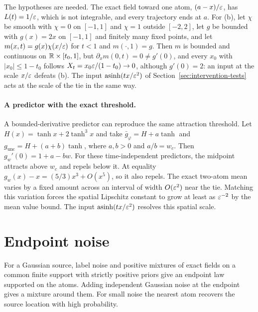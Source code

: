 \documentclass{article} %
\theoremstyle{plain}
\theoremstyle{definition}
\theoremstyle{remark}
\begin{document}
The hypotheses are needed. The exact field toward one atom, $(a-x)/\varepsilon$, has
$L(t)=1/\varepsilon$, which is not integrable, and every trajectory ends at $a$. For (b), let
$\chi$ be smooth with $\chi=0$ on $[-1,1]$ and $\chi=1$ outside $[-2,2]$, let $g$ be bounded with
$g(x)=2x$ on $[-1,1]$ and finitely many fixed points, and let $m(x,t)=g(x)\chi(x/\varepsilon)$ for
$t<1$ and $m(\cdot,1)=g$. Then $m$ is bounded and continuous on $\mathbb{R}\times[t_0,1]$, but
$\partial_xm(0,t)=0\ne g'(0)$, and every $x_0$ with $|x_0|\le1-t_0$ follows
$X_t=x_0\varepsilon/(1-t_0)\to0$, although $g'(0)=2$: an input at the scale $x/\varepsilon$ defeats
(b). The input $\operatorname{asinh}(tx/\varepsilon^2)$ of Section~\ref{sec:intervention-tests} acts at
the scale of the tie in the same way.

\paragraph{A predictor with the exact threshold.} A bounded-derivative predictor can reproduce the same attraction threshold. Let
$H(x)=\tanh x+2\tanh^3x$ and take $\bar g_\varphi=H+a\tanh$ and
$g_{\mathrm{unc}}=H+(a+b)\tanh$, where $a,b>0$ and $a/b=w_c$.
Then $g_w'(0)=1+a-bw$. For these time-independent predictors, the midpoint attracts above $w_c$
and repels below it. At equality $g_w(x)-x=(5/3)x^3+O(x^5)$, so it also repels.
The exact two-atom mean varies by a fixed amount across an interval of width $O(\varepsilon^2)$
near the tie. Matching this variation forces the spatial Lipschitz constant to grow at least as
$\varepsilon^{-2}$ by the mean value bound. The input $\operatorname{asinh}(tx/\varepsilon^2)$ resolves
this spatial scale.

\section{Endpoint noise}
\label{app:noise}

For a Gaussian source, label noise and positive mixtures of exact fields on a common
finite support with strictly positive priors give an endpoint law supported on the atoms.
Adding independent Gaussian noise at the endpoint gives a mixture around them. For
small noise the nearest atom recovers the source location with high probability.
\end{document}
